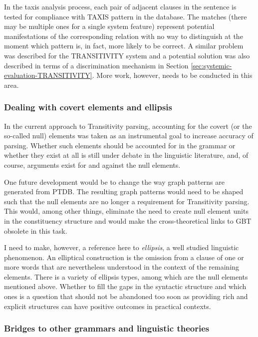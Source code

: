     In the taxis analysis process, each pair of adjacent clauses in the sentence is tested for compliance with TAXIS pattern in the database. The matches (there may be multiple ones for a single system feature) represent potential manifestations of the corresponding relation with no way to distinguish at the moment which pattern is, in fact, more likely to be correct. A similar problem was described for the TRANSITIVITY system and a potential solution was also described in terms of a discrimination mechanism in Section \ref{sec:systemic-evaluation-TRANSITIVITY}. More work, however, needs to be conducted in this area. 

\subsubsection{Dealing with covert elements and ellipsis}
    
    In the current approach to Transitivity parsing, accounting for the covert (or the so-called null) elements was taken as an instrumental goal to increase accuracy of parsing. Whether such elements should be accounted for in the grammar or whether they exist at all is still under debate in the linguistic literature, and, of course, arguments exist for and against the null elements.
    
    One future development would be to change the way graph patterns are generated from PTDB. The resulting graph patterns would need to be shaped such that the null elements are no longer a requirement for Transitivity parsing. This would, among other things, eliminate the need to create null element units in the constituency structure and would make the cross-theoretical links to GBT obsolete in this task. 

    I need to make, however, a reference here to \textit{ellipsis}, a well studied linguistic phenomenon. An elliptical construction is the omission from a clause of one or more words that are nevertheless understood in the context of the remaining elements. There is a variety of ellipsis types, among which are the null elements mentioned above. Whether to fill the gaps in the syntactic structure and which ones is a question that should not be abandoned too soon as providing rich and explicit structures can have positive outcomes in practical contexts. 

\subsubsection{Bridges to other grammars and linguistic theories}

